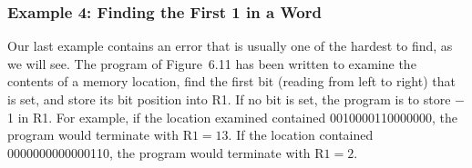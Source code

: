 \documentclass{patt}
\begin{document}
\subsubsection{Example 4: Finding the First 1 in a Word}

\enlargethispage{-2\baselineskip}

Our last example contains an error that is usually one of the
hardest to find, as we will see. The program of Figure~6.11 has been 
written to examine the contents of a memory location,
find the first bit (reading from left to right) that is set, and store
its bit position into R1. If no bit is set, the program
is to store $-$1 in R1.  For example, if the location examined
contained 0010000110000000, the program would terminate with
R$1=13$.  If the location contained 0000000000000110, the program
would terminate with R$1=2$.
\end{document}
